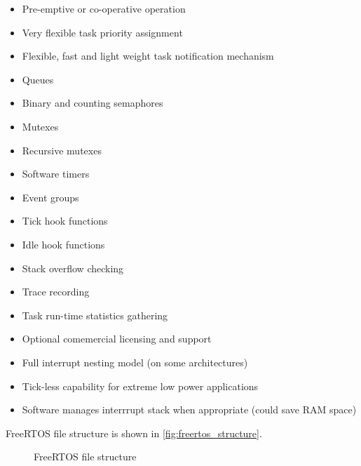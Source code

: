 \begin{itemize}
    
    \item Pre-emptive or co-operative operation
    \item Very flexible task priority assignment
    \item Flexible, fast and light weight task notification mechanism
    \item Queues
    \item Binary and counting semaphores
    \item Mutexes
    \item Recursive mutexes
    \item Software timers
    \item Event groups
    \item Tick hook functions
    \item Idle hook functions
    \item Stack overflow checking
    \item Trace recording
    \item Task run-time statistics gathering
    \item Optional comemercial licensing and support
    \item Full interrupt nesting model (on some architectures)
    \item Tick-less capability for extreme low power applications
    \item Software manages interrrupt stack when appropriate (could save RAM space)
    
\end{itemize}

\noindent FreeRTOS file structure is shown in \autoref{fig:freertos_structure}.

\begin{figure}[H]
\caption{FreeRTOS file structure}
\label{fig:freertos_structure}
\end{figure}

